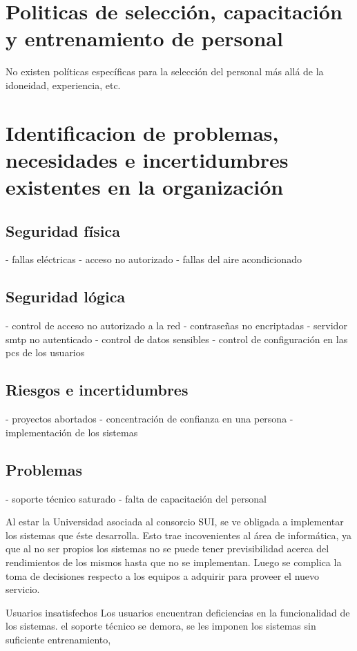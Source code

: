 \documentclass[a4paper,11pt,oneside]{article}
\begin{document}
\section{Politicas de selección, capacitación y entrenamiento de personal}

No existen políticas específicas para la selección del personal más
allá de la idoneidad, experiencia, etc.

\section{Identificacion de problemas, necesidades e incertidumbres existentes en la organización}
%
\subsection*{Seguridad física}
 - fallas eléctricas
 - acceso no autorizado
 - fallas del aire acondicionado
 
\subsection*{Seguridad lógica}
 - control de acceso no autorizado a la red
 - contraseñas no encriptadas
 - servidor smtp no autenticado
 - control de datos sensibles
 - control de configuración en las pcs de los usuarios

\subsection*{Riesgos e incertidumbres}
 - proyectos abortados
 - concentración de confianza en una persona
 - implementación de los sistemas
 
\subsection*{Problemas}
 - soporte técnico saturado
 - falta de capacitación del personal

Al estar la Universidad asociada al consorcio SUI, se ve obligada a
implementar los sistemas que éste desarrolla. Esto trae incovenientes
al área de informática, ya que al no ser propios los sistemas no se
puede tener previsibilidad acerca del rendimientos de los mismos hasta
que no se implementan. Luego se complica la toma de decisiones
respecto a los equipos a adquirir para proveer el nuevo servicio.

Usuarios insatisfechos Los usuarios encuentran deficiencias en la
funcionalidad de los sistemas.  el soporte técnico se demora, se les
imponen los sistemas sin suficiente entrenamiento,
\end{document}
